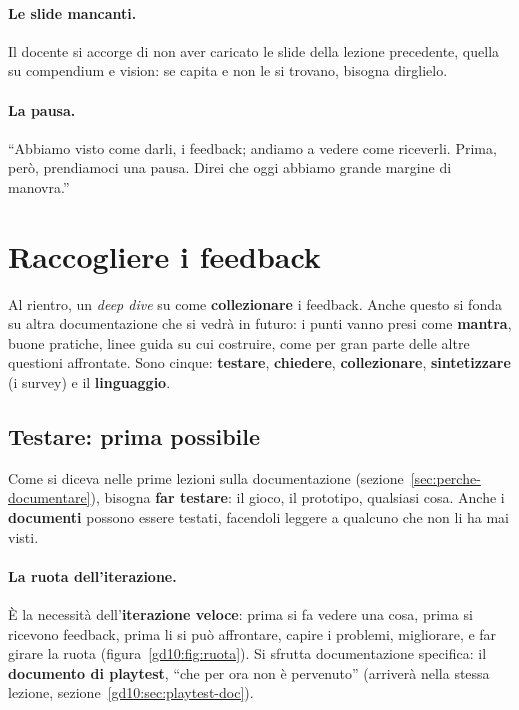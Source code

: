 \paragraph{Le slide mancanti.} Il docente si accorge di non aver caricato le
slide della lezione precedente, quella su compendium e vision: se capita e
non le si trovano, bisogna dirglielo.

\paragraph{La pausa.} ``Abbiamo visto come darli, i feedback; andiamo a
vedere come riceverli. Prima, però, prendiamoci una pausa. Direi che oggi
abbiamo grande margine di manovra.''

\section{Raccogliere i feedback}
\label{gd10:sec:raccogliere}

Al rientro, un \emph{deep dive} su come \textbf{collezionare} i feedback.
Anche questo si fonda su altra documentazione che si vedrà in futuro: i
punti vanno presi come \textbf{mantra}, buone pratiche, linee guida su cui
costruire, come per gran parte delle altre questioni affrontate. Sono
cinque: \textbf{testare}, \textbf{chiedere}, \textbf{collezionare},
\textbf{sintetizzare} (i survey) e il \textbf{linguaggio}.

\subsection{Testare: prima possibile}

Come si diceva nelle prime lezioni sulla documentazione
(sezione~\ref{sec:perche-documentare}), bisogna \textbf{far testare}: il
gioco, il prototipo, qualsiasi cosa. Anche i \textbf{documenti} possono
essere testati, facendoli leggere a qualcuno che non li ha mai visti.

\paragraph{La ruota dell'iterazione.} È la necessità dell'\textbf{iterazione
veloce}: prima si fa vedere una cosa, prima si ricevono feedback, prima li
si può affrontare, capire i problemi, migliorare, e far girare la ruota
(figura~\ref{gd10:fig:ruota}). Si sfrutta documentazione specifica: il
\textbf{documento di playtest}, ``che per ora non è pervenuto'' (arriverà
nella stessa lezione, sezione~\ref{gd10:sec:playtest-doc}).

